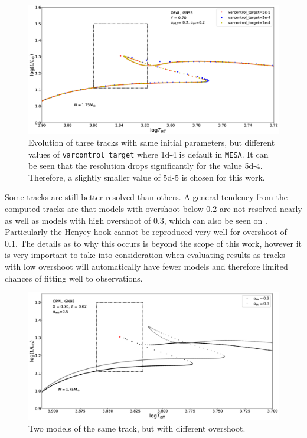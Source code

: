 \begin{figure}[htbp]
    \centering
    \includegraphics[width=1\textwidth]{varcontrol_res.eps}
    \caption{Evolution of three tracks with same initial parameters, but different values of \texttt{varcontrol\_target} where 1d-4 is default in \texttt{MESA}. It can be seen that the resolution drops significantly for the value 5d-4. Therefore, a slightly smaller value of 5d-5 is chosen for this work.}
    \label{varcontrol}
\end{figure}


Some tracks are still better resolved than others. A general tendency from the computed tracks are that models with overshoot below 0.2 are not resolved nearly as well as models with high overshoot of 0.3, which can also be seen on . Particularly the Henyey hook cannot be reproduced very well for overshoot of 0.1. The details as to why this occurs is beyond the scope of this work, however it is very important to take into consideration when evaluating results as tracks with low overshoot will automatically have fewer models and therefore limited chances of fitting well to observations. 

\begin{figure}[htbp]
    \centering
    \includegraphics[width=1\textwidth]{resolution_overshoot.eps}
    \caption{Two models of the same track, but with different overshoot.}
    \label{ovresol}
  \end{figure}


